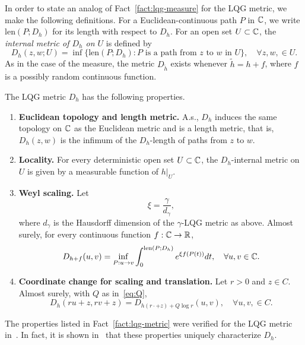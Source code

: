 \documentclass[12pt]{amsart}
\numberwithin{equation}{section}
\begin{document}
	In order to state an analog of Fact~\ref{fact:lqg-measure} for the LQG metric, we make the following definitions. For a Euclidean-continuous path $P$ in $\mathbb{C}$, we write $\mathrm{len}(P; D_h)$ for its length with respect to $D_h$.  
	For an open set $U \subset \mathbb{C}$, the {\it internal metric of $D_h$ on $U$}
	is defined by 
	\begin{equation} \label{eq:internal-metric}
	D_h(z,w; U) = \inf \{ \mathrm{len}(P; D_h) : \mbox{$P$ is a path from $z$ to $w$ in $U$}\}, \quad \mbox{$\forall z,w, \in U$}.
	\end{equation}
	As in the case of the measure, the metric $D_{\tilde h}$ exists whenever $\tilde h = h + f$, where $f$ is a possibly random continuous function. 
	
	\begin{fact} \label{fact:lqg-metric}
		The LQG metric $D_h$ has the following properties.
		\begin{enumerate}[label=\Roman*.]
			\item {\bf Euclidean topology and length metric.} A.s., $D_h$ induces the same topology on $\mathbb{C}$ as the Euclidean metric and is a length metric, that is, $D_h(z,w)$ is the infimum of the $D_h$-length of paths from $z$ to $w$.
			\item {\bf Locality.} For every deterministic open set $U \subset \mathbb{C}$, the $D_h$-internal metric on $U$ is given by a measurable function of 
			$h \vert_{U}$. 
			\item {\bf Weyl scaling.} Let 
			\begin{equation} \label{eq:xi}
			\xi = \frac{\gamma}{d_{\gamma}} ,
			\end{equation}
			where $d_\gamma$ is the Hausdorff dimension of the $\gamma$-LQG metric as above. 
			Almost surely, for every continuous function $f: \mathbb{C} \to \mathbb{R}$,
			\[
			D_{h + f}(u, v) = \inf_{P: u \to v} \int_0^{\mathrm{len}(P; D_h)} e^{\xi f(P(t))} d t, \quad \forall u,v \in \mathbb{C}.
			\]
			
			\item {\bf Coordinate change for scaling and translation.} Let $r > 0$ and $z \in C$. Almost surely, with $Q$ as in~\eqref{eq:Q},  
			\[
			D_h(r u + z, r v + z) = D_{h(r\cdot +z) + Q \log r}(u,v), \quad \forall u,v, \in C.
			\]
		\end{enumerate}
	\end{fact}
	
	The properties listed in Fact~\ref{fact:lqg-metric} were verified for the LQG metric in~\cite{ding2020tightness,dubedat2020weak,gwynne2021existence}. In fact, it is shown in~\cite{gwynne2021existence} that these properties uniquely characterize $D_h$. 
	
\end{document}
